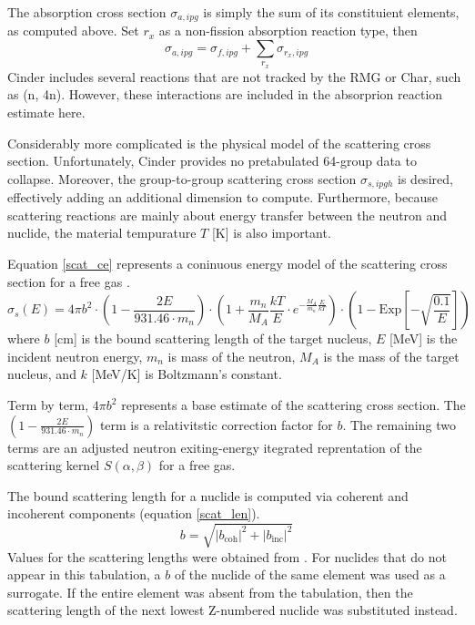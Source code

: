 The absorption cross section $\sigma_{a,ipg}$ is simply the sum of its constituient elements, as 
computed above.  Set $r_x$ as a non-fission absorption reaction type, then
\begin{equation}
\label{sig_a_model}
\sigma_{a,ipg} = \sigma_{f,ipg} + \sum_{r_x} \sigma_{r_x,ipg}
\end{equation}
Cinder includes several reactions that are not tracked by the RMG or Char, such as (n, 4n). 
However, these interactions are included in the absorprion reaction estimate here.  

Considerably more complicated is the physical model of the scattering cross section.  Unfortunately, 
Cinder provides no pretabulated 64-group data to collapse.  Moreover, the group-to-group scattering
cross section $\sigma_{s,ipgh}$ is desired, effectively adding an additional dimension to compute.
Furthermore, because scattering reactions are mainly about energy transfer between the neutron and 
nuclide, the material tempurature $T$ [K] is also important.

Equation \ref{scat_ce} represents a coninuous energy model of the scattering cross section for a free gas
\cite{Yamamoto2006, Mattes2005}.
\begin{equation}
\label{scat_ce}
\sigma_s(E) = 4 \pi b^2 \cdot \left(1 - \frac{2E}{931.46 \cdot m_n}\right) \cdot
              \left(1 + \frac{m_n}{M_A} \frac{kT}{E} \cdot e^{-\frac{M_A}{m_n}\frac{E}{kT}}\right) 
              \cdot \left(1 - \mbox{Exp}\left[-\sqrt{\frac{0.1}{E}}\right]\right)
\end{equation}
where $b$ [cm] is the bound scattering length of the target nucleus, $E$ [MeV] is the incident
neutron energy, $m_n$ is mass of the neutron, $M_A$ is the mass of the target nucleus, and
$k$ [MeV/K] is Boltzmann's constant.

Term by term, $4 \pi b^2$ represents a base estimate of the scattering cross section.  
The $\left(1 - \frac{2E}{931.46 \cdot m_n}\right)$ term is a relativitstic correction
factor for $b$.  The remaining two terms are an adjusted neutron exiting-energy itegrated 
reprentation of the scattering kernel $S(\alpha, \beta)$ for a free gas.

The bound scattering length for a nuclide is computed via coherent and incoherent components
(equation \ref{scat_len}).
\begin{equation}
\label{scat_len}
b = \sqrt{\left| b_{\mbox{coh}} \right|^2 + \left| b_{\mbox{inc}} \right|^2}
\end{equation}
Values for the scattering lengths were obtained from \cite{Sears1992}.  For nuclides
that do not appear in this tabulation, a $b$ of the nuclide of the same element was
used as a surrogate.  If the entire element was absent from the tabulation, then the 
scattering length of the next lowest Z-numbered nuclide was substituted instead.

